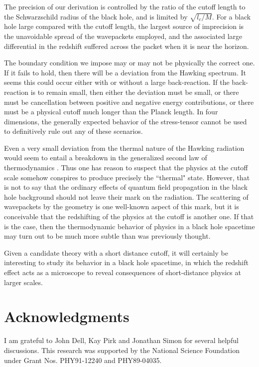 \documentclass[12pt]{article}
\begin{document}
The precision of our derivation is controlled by the
ratio of the cutoff length to the Schwarzschild radius
of the black hole, and is limited by $\sqrt{l_c/M}$.
For a black hole large compared with
the cutoff length, the largest source of imprecision
is the unavoidable spread of the wavepackets employed,
and the associated large differential in the redshift suffered
across the packet when it is near the horizon.

The boundary condition we impose may
or may not be physically the correct one.
If it fails to hold, then there will be a deviation from
the Hawking spectrum. It seems this could occur either with or without
a large back-reaction. If the back-reaction is to remain small,
then either the deviation must be small, or there must be cancellation
between positive and negative energy contributions, or there must
be a physical cutoff much longer than the Planck length.
In four dimensions, the generally expected behavior of the
stress-tensor cannot be used to definitively
rule out any of these scenarios.

Even a very small deviation from the
thermal nature of the Hawking radiation would seem to entail a
breakdown in the generalized second law of
thermodynamics \cite{Beck,UnWald,ThorneZurek}.
Thus one has reason to suspect that the
physics at the cutoff scale somehow conspires to
produce precisely the ``thermal" state. However, that is not
to say that the ordinary effects of quantum field
propagation in the black hole background should not
leave their mark on the radiation. The scattering of
wavepackets by
the geometry is one well-known aspect of this mark,
but it is conceivable that the redshifting of the
physics at the cutoff is another one. If that is the
case, then the thermodynamic behavior of physics in a
black hole spacetime may turn out to be much more
subtle than was previously thought.

Given a candidate theory with a short distance cutoff,
it will certainly be interesting to study its behavior
in a black hole spacetime, in which the redshift
effect acts as a microscope to reveal consequences of
short-distance physics at larger scales.

\section*{Acknowledgments}

I am grateful to John Dell, Kay Pirk and Jonathan Simon for several
helpful discussions. This research was supported by
the National Science Foundation under Grant Nos. PHY91-12240
and PHY89-04035.
\end{document}
